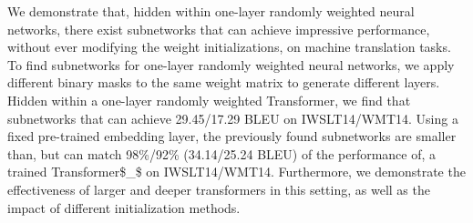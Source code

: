 We demonstrate that, hidden within one-layer randomly weighted neural networks, there exist subnetworks that can achieve impressive performance, without ever modifying the weight initializations, on machine translation tasks. To find subnetworks for one-layer randomly weighted neural networks, we apply different binary masks to the same weight matrix to generate different layers. Hidden within a one-layer randomly weighted Transformer, we find that subnetworks that can achieve 29.45/17.29 BLEU on IWSLT14/WMT14. Using a fixed pre-trained embedding layer, the previously found subnetworks are smaller than, but can match 98\%/92\% (34.14/25.24 BLEU) of the performance of, a trained Transformer\$\_\$ on IWSLT14/WMT14. Furthermore, we demonstrate the effectiveness of larger and deeper transformers in this setting, as well as the impact of different initialization methods.
